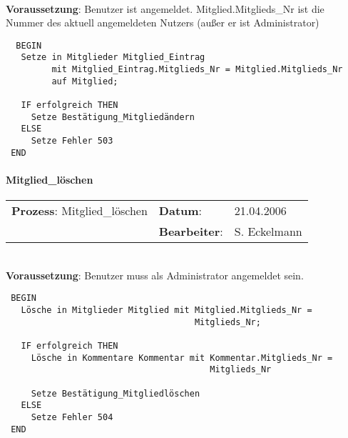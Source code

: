 \hrulefill\\
\textbf{Voraussetzung}: Benutzer ist angemeldet. Mitglied.Mitglieds\_Nr ist die Nummer des aktuell angemeldeten Nutzers (außer er ist Administrator)
\begin{verbatim}
  BEGIN
   Setze in Mitglieder Mitglied_Eintrag
         mit Mitglied_Eintrag.Mitglieds_Nr = Mitglied.Mitglieds_Nr
         auf Mitglied;
  
   IF erfolgreich THEN
     Setze Bestätigung_Mitgliedändern
   ELSE
     Setze Fehler 503
 END
\end{verbatim}
\hrulefill



\paragraph{Mitglied\_löschen}
\begin{tabular}[t]{p{9.5cm}ll}
\textbf{Prozess}: Mitglied\_löschen  	&\textbf{Datum}:      &21.04.2006\\
					&\textbf{Bearbeiter}: &S. Eckelmann\\
\end{tabular}

\hrulefill\\
\textbf{Voraussetzung}: Benutzer muss als Administrator angemeldet sein.
\begin{verbatim}
 BEGIN
   Lösche in Mitglieder Mitglied mit Mitglied.Mitglieds_Nr = 
                                     Mitglieds_Nr;

   IF erfolgreich THEN
     Lösche in Kommentare Kommentar mit Kommentar.Mitglieds_Nr = 
                                        Mitglieds_Nr

     Setze Bestätigung_Mitgliedlöschen
   ELSE
     Setze Fehler 504
 END
\end{verbatim}
\hrulefill